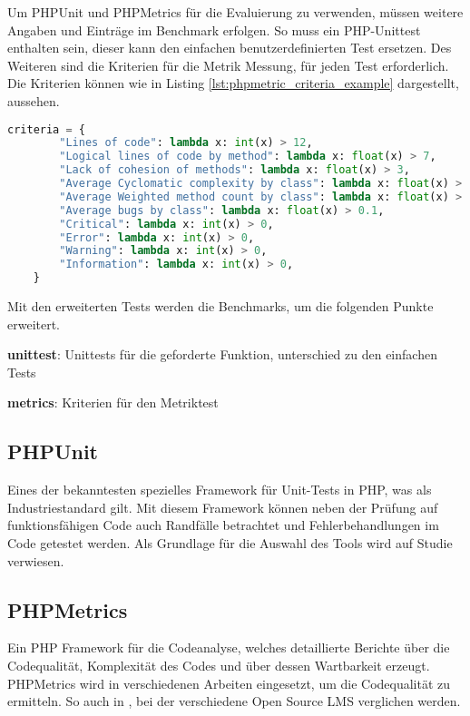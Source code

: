 Um PHPUnit und PHPMetrics für die Evaluierung zu verwenden, müssen weitere Angaben und Einträge im Benchmark erfolgen. So muss ein PHP-Unittest enthalten sein, dieser kann den einfachen benutzerdefinierten Test ersetzen. Des Weiteren sind die Kriterien für die Metrik Messung, für jeden Test erforderlich. Die Kriterien können wie in Listing \ref{lst:phpmetric_criteria_example} dargestellt, aussehen.

\begin{lstlisting}[language=python,caption={Beispiel für Bewertungskriterien},label=lst:phpmetric_criteria_example]
	criteria = {
		"Lines of code": lambda x: int(x) > 12,
		"Logical lines of code by method": lambda x: float(x) > 7,
		"Lack of cohesion of methods": lambda x: float(x) > 3,
		"Average Cyclomatic complexity by class": lambda x: float(x) > 10,
		"Average Weighted method count by class": lambda x: float(x) > 20,
		"Average bugs by class": lambda x: float(x) > 0.1,
		"Critical": lambda x: int(x) > 0,
		"Error": lambda x: int(x) > 0,
		"Warning": lambda x: int(x) > 0,
		"Information": lambda x: int(x) > 0,
	}
\end{lstlisting}

Mit den erweiterten Tests werden die Benchmarks, um die folgenden Punkte erweitert.

\begin{myitemize}
	\item \textbf{unittest}: Unittests für die geforderte Funktion, unterschied zu den einfachen Tests
	\item \textbf{metrics}: Kriterien für den Metriktest
\end{myitemize}

\subsection{PHPUnit}
Eines der bekanntesten spezielles Framework für Unit-Tests in PHP, was als Industriestandard gilt. Mit diesem Framework können neben der Prüfung auf funktionsfähigen Code auch Randfälle betrachtet und Fehlerbehandlungen im Code getestet werden. Als Grundlage für die Auswahl des Tools wird auf Studie \cite{mohamad-2016} verwiesen.

\subsection{PHPMetrics}
Ein PHP Framework für die Codeanalyse, welches detaillierte Berichte über die Codequalität, Komplexität des Codes und über dessen Wartbarkeit erzeugt. PHPMetrics wird in verschiedenen Arbeiten eingesetzt, um die Codequalität zu ermitteln. So auch in \cite{anggrain-2016}, bei der verschiedene Open Source LMS verglichen werden.

